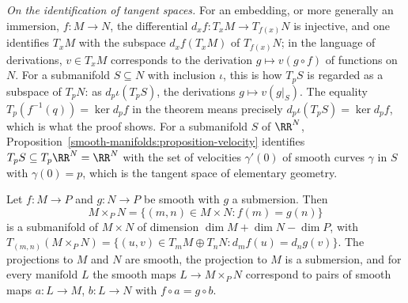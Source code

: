 \emph{On the identification of tangent spaces.} For an embedding, or more generally an immersion, $f \colon M \to N$, the differential $d_xf \colon T_xM \to T_{f(x)}N$ is injective, and one
identifies $T_xM$ with the subspace $d_xf(T_xM)$ of $T_{f(x)}N$; in the language of derivations, $v \in T_xM$ corresponds to the derivation $g \mapsto v(g \circ f)$ of functions on $N$. For a
submanifold $S \subseteq N$ with inclusion $\iota$, this is how $T_pS$ is regarded as a subspace of $T_pN$: as $d_p\iota(T_pS)$, the derivations $g \mapsto v(g|_S)$. The equality
$T_p(f^{-1}(q)) = \ker d_pf$ in the theorem means precisely $d_p\iota(T_pS) = \ker d_pf$, which is what the proof shows. For a submanifold $S$ of $\RR^N$, Proposition~\ref{smooth-manifolds:proposition-velocity}
identifies $T_pS \subseteq T_p\RR^N = \RR^N$ with the set of velocities $\gamma'(0)$ of smooth curves $\gamma$ in $S$ with $\gamma(0) = p$, which is the tangent
space of elementary geometry.

\begin{proposition}\label{smooth-manifolds:proposition-fibre-product}
Let $f \colon M \to P$ and $g \colon N \to P$ be smooth with $g$ a submersion. Then
\[
M \times_PN = \{(m, n) \in M \times N : f(m) = g(n)\}
\]
is a submanifold of $M \times N$ of dimension $\dim M + \dim N - \dim P$, with
$T_{(m,n)}(M \times_PN) = \{(u, v) \in T_mM \oplus T_nN : d_mf(u) = d_ng(v)\}$. The projections to $M$ and $N$ are smooth, the projection to $M$ is a submersion,
and for every manifold $L$ the smooth maps $L \to M \times_PN$ correspond to pairs of smooth maps $a \colon L \to M$, $b \colon L \to N$ with $f \circ a = g \circ b$.
\end{proposition}

